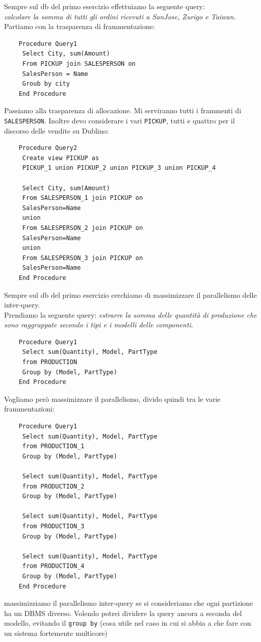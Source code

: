 \documentclass[a4paper,12pt, oneside]{book}
\begin{document}
\begin{esercizio}
  Sempre sul db del primo esercizio effettuiamo la seguente query:\\
  \textit{calcolare la somma di tutti gli ordini ricevuti a SanJose, Zurigo e
    Taiwan}.\\
  Partiamo con la trasparenza di frammentazione:
  \begin{verbatim}
    Procedure Query1
     Select City, sum(Amount)
     From PICKUP join SALESPERSON on
     SalesPerson = Name
     Groub by city
    End Procedure
  \end{verbatim}
  Passiamo alla trasparenza di allocazione. Mi serviranno tutti i frammenti di
  \texttt{SALESPERSON}. Inoltre devo considerare i vari \texttt{PICKUP}, tutti e
  quattro per il discorso delle vendite su Dublino:
  \begin{verbatim}
    Procedure Query2
     Create view PICKUP as
     PICKUP_1 union PICKUP_2 union PICKUP_3 union PICKUP_4
     
     Select City, sum(Amount)
     From SALESPERSON_1 join PICKUP on
     SalesPerson=Name
     union
     From SALESPERSON_2 join PICKUP on
     SalesPerson=Name
     union
     From SALESPERSON_3 join PICKUP on
     SalesPerson=Name
    End Procedure
  \end{verbatim}
\end{esercizio}
\begin{esercizio}
   Sempre sul db del primo esercizio cerchiamo di massimizzare il parallelismo
   delle inter-query.\\
   Prendiamo la seguente query:
   \textit{estrarre la somma delle quantità di produzione che sono raggruppate
     secondo i tipi e i modelli delle componenti}.\\
   \begin{verbatim}
    Procedure Query1
     Select sum(Quantity), Model, PartType
     from PRODUCTION
     Group by (Model, PartType)
    End Procedure
  \end{verbatim}
  Vogliamo però massimizzare il parallelismo, divido quindi tra le varie
  frammentazioni:
  \begin{verbatim}
    Procedure Query1
     Select sum(Quantity), Model, PartType
     from PRODUCTION_1
     Group by (Model, PartType)

     Select sum(Quantity), Model, PartType
     from PRODUCTION_2
     Group by (Model, PartType)

     Select sum(Quantity), Model, PartType
     from PRODUCTION_3
     Group by (Model, PartType)

     Select sum(Quantity), Model, PartType
     from PRODUCTION_4
     Group by (Model, PartType)
    End Procedure
  \end{verbatim}
  massimizziamo il parallelismo inter-query se si consideriamo che ogni
  partizione ha un DBMS diverso. Volendo potrei dividere la query ancora a
  seconda del modello, evitando il \texttt{group by} (cosa utile nel caso in cui
  si abbia a che fare con un sistema fortemente multicore)
\end{esercizio}
\end{document}
